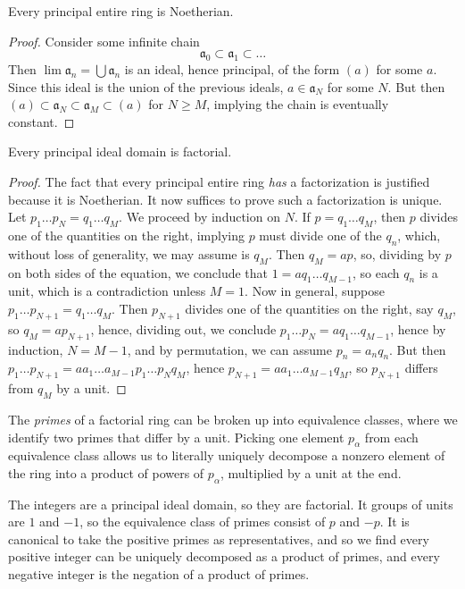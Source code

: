 \begin{theorem}
    Every principal entire ring is Noetherian.
\end{theorem}
\begin{proof}
    Consider some infinite chain
    \[ \mathfrak{a}_0 \subset \mathfrak{a}_1 \subset \dots \]
    Then $\lim \mathfrak{a}_n = \bigcup \mathfrak{a}_n$ is an ideal, hence principal, of the form $(a)$ for some $a$. Since this ideal is the union of the previous ideals, $a \in \mathfrak{a}_N$ for some $N$. But then $(a) \subset \mathfrak{a}_N \subset \mathfrak{a}_M \subset (a)$ for $N \geq M$, implying the chain is eventually constant.
\end{proof}

\begin{theorem}
    Every principal ideal domain is factorial.
\end{theorem}
\begin{proof}
    The fact that every principal entire ring {\it has} a factorization is justified because it is Noetherian. It now suffices to prove such a factorization is unique. Let $p_1 \dots p_N = q_1 \dots q_M$. We proceed by induction on $N$. If $p = q_1 \dots q_M$, then $p$ divides one of the quantities on the right, implying $p$ must divide one of the $q_n$, which, without loss of generality, we may assume is $q_M$. Then $q_M = ap$, so, dividing by $p$ on both sides of the equation, we conclude that $1 = a q_1 \dots q_{M-1}$, so each $q_n$ is a unit, which is a contradiction unless $M = 1$. Now in general, suppose $p_1 \dots p_{N+1} = q_1 \dots q_M$. Then $p_{N+1}$ divides one of the quantities on the right, say $q_M$, so $q_M = ap_{N+1}$, hence, dividing out, we conclude $p_1 \dots p_N = a q_1 \dots q_{M-1}$, hence by induction, $N = M-1$, and by permutation, we can assume $p_n = a_nq_n$. But then $p_1 \dots p_{N+1} = aa_1 \dots a_{M-1} p_1 \dots p_N q_M$, hence $p_{N+1} = aa_1 \dots a_{M-1} q_M$, so $p_{N+1}$ differs from $q_M$ by a unit.
\end{proof}

The {\it primes} of a factorial ring can be broken up into equivalence classes, where we identify two primes that differ by a unit. Picking one element $p_\alpha$ from each equivalence class allows us to literally uniquely decompose a nonzero element of the ring into a product of powers of $p_\alpha$, multiplied by a unit at the end.

\begin{example}
    The integers are a principal ideal domain, so they are factorial. It groups of units are $1$ and $-1$, so the equivalence class of primes consist of $p$ and $-p$. It is canonical to take the positive primes as representatives, and so we find every positive integer can be uniquely decomposed as a product of primes, and every negative integer is the negation of a product of primes.
\end{example}

